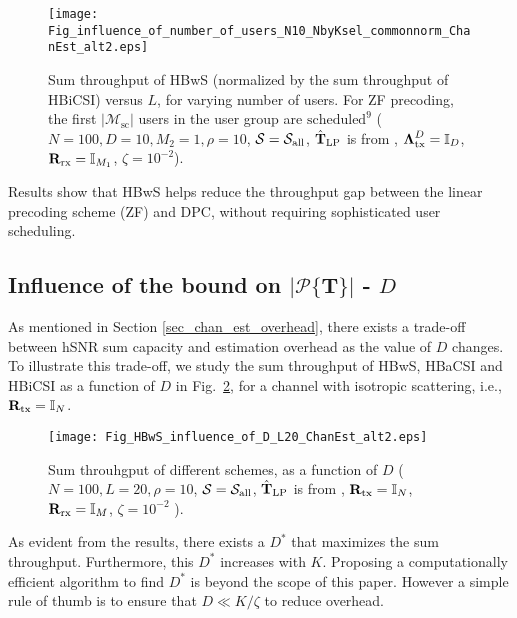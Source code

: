 \documentclass[journal,comsoc]{IEEEtran}
\begin{document}
%
\begin{figure}[!h]
\centering
\texttt{[image: Fig\_influence\_of\_number\_of\_users\_N10\_NbyKsel\_commonnorm\_ChanEst\_alt2.eps]}
\caption{Sum throughput of HBwS (normalized by the sum throughput of HBiCSI) versus $L$, for varying number of users. For ZF precoding, the first $|\mathcal{M}_{\text{sc}}|$ users in the user group are $\text{scheduled}^{9}$ \big($N=100, D=10, M_2 = 1, \rho=10$, $\mathcal{S} = \mathcal{S}_{\rm all}$, $\hat{\mathbf{T}}_{\rm LP}$ is from \cite{MedraRepository}, $\boldsymbol{\Lambda}^{D}_{\rm tx} = \mathbb{I}_D$, $\mathbf{R}_{\rm rx} = \mathbb{I}_{M_{1}}$, $\zeta = 10^{-2}$\big).}
\label{Fig_influence_L_MU}
\end{figure}
%
Results show that HBwS helps reduce the throughput gap between the linear precoding scheme (ZF) and DPC, without requiring sophisticated user scheduling. 
%

\subsection{Influence of the bound on $\big| \mathcal{P}\{\mathbf{T}\} \big|$ - $D$}
As mentioned in Section \ref{sec_chan_est_overhead}, there exists a trade-off between hSNR sum capacity and estimation overhead as the value of $D$ changes. To illustrate this trade-off, we study the sum throughput of HBwS, HBaCSI and HBiCSI as a function of $D$ in Fig.~\ref{Fig_influence_D}, for a channel with isotropic scattering, i.e., $\mathbf{R}_{\rm tx} = \mathbb{I}_N$. 
%
\begin{figure}[!h]
\centering
\texttt{[image: Fig\_HBwS\_influence\_of\_D\_L20\_ChanEst\_alt2.eps]}
\caption{Sum throuhgput of different schemes, as a function of $D$ \big($N=100, L=20, \rho=10$, $\mathcal{S} = \mathcal{S}_{\rm all}$, $\hat{\mathbf{T}}_{\rm LP}$ is from \cite{MedraRepository}, $\mathbf{R}_{\rm tx} = \mathbb{I}_N$, $\mathbf{R}_{\rm rx} = \mathbb{I}_M$, $\zeta= 10^{-2}$ \big).}
\label{Fig_influence_D}
\end{figure}
%
As evident from the results, there exists a $D^{*}$ that maximizes the sum throughput. Furthermore, this $D^{*}$ increases with $K$. Proposing a computationally efficient algorithm to find $D^{*}$ is beyond the scope of this paper. However a simple rule of thumb is to ensure that $D \ll K/\zeta$ to reduce overhead. 
\end{document}
